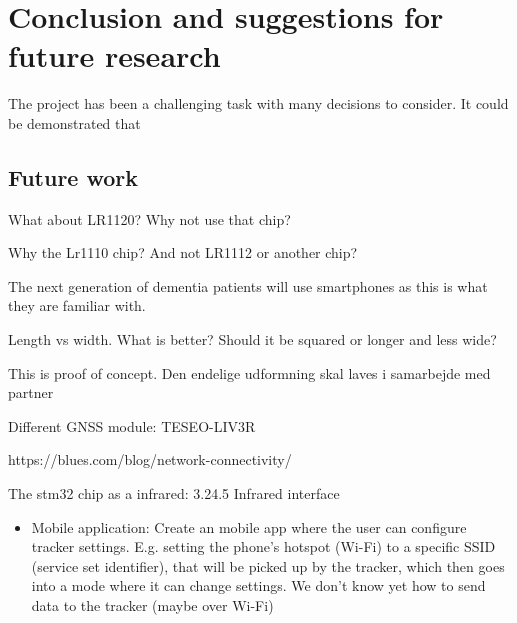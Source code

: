 \section{Conclusion and suggestions for future research} \label{sec:conclusion}

The project has been a challenging task with many decisions to consider. It could be demonstrated that


\subsection{Future work}

What about LR1120? Why not use that chip?


Why the Lr1110 chip? And not LR1112 or another chip?


The next generation of dementia patients will use smartphones as this is what they are familiar with.

Length vs width. What is better? Should it be squared or longer and less wide?

This is proof of concept. Den endelige udformning skal laves i samarbejde med partner

Different GNSS module: TESEO-LIV3R

https://blues.com/blog/network-connectivity/


The stm32 chip as a infrared: 3.24.5 Infrared interface


\begin{itemize}
  \item Mobile application: Create an mobile app where the user can configure tracker settings. E.g. setting the phone's hotspot (Wi-Fi) to a specific \ac{SSID} (service set identifier), that will be picked up by the tracker, which then goes into a mode where it can change settings. We don't know yet how to send data to the tracker (maybe over Wi-Fi)
\end{itemize}